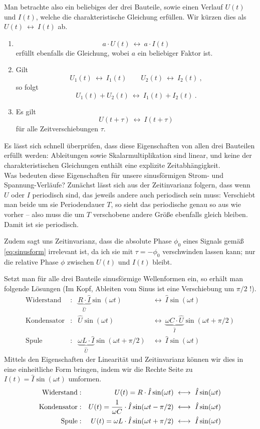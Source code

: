 \def\llra{~\longleftrightarrow~}
Man betrachte also ein beliebiges der drei Bauteile, sowie einen Verlauf $U(t)$ und $I(t)$, welche die charakteristische Gleichung erfüllen. Wir kürzen dies als $U(t) \llra I(t)$ ab.
\begin{enumerate}[label=(\arabic*)]
    \item
        \[ a\cdot U(t) \llra a \cdot I(t) \]
        erfüllt ebenfalls die Gleichung, wobei $a$ ein beliebiger Faktor ist.
    \item Gilt
        \[ U_1(t) \llra I_1(t) \qquad U_2(t) \llra I_2(t) ~,\]
        so folgt
        \[ U_1(t) + U_2(t) \llra I_1(t) + I_2(t) ~. \]
    \item Es gilt
        \[ U(t+\tau) \llra I(t+\tau) \]
        für alle Zeitverschiebungen $\tau$.
\end{enumerate}

Es lässt sich schnell überprüfen, dass diese Eigenschaften von allen drei Bauteilen erfüllt werden: Ableitungen sowie Skalarmultiplikation sind linear, und keine der charakteristischen Gleichungen enthält eine explizite Zeitabhängigkeit.
\\

Was bedeuten diese Eigenschaften für unsere sinusförmigen Strom- und Spannung-Verläufe? Zunächst lässt sich aus der Zeitinvarianz folgern, dass wenn $U$ oder $I$ periodisch sind, das jeweils andere auch periodisch sein muss: Verschiebt man beide um sie Periodendauer $T$, so sieht das periodische genau so aus wie vorher -- also muss die um $T$ verschobene andere Größe ebenfalls gleich bleiben. Damit ist sie periodisch.

Zudem sagt uns Zeitinvarianz, dass die absolute Phase $\phi_0$ eines Signals gemäß \eqref{eq:sinusform} irrelevant ist, da ich sie mit $\tau = -\phi_0$ verschwinden lassen kann; nur die relative Phase $\phi$ zwischen $U(t)$ und $I(t)$ bleibt.

Setzt man für alle drei Bauteile sinusförmige Wellenformen ein, so erhält man folgende Lösungen (Im Kopf, Ableiten vom Sinus ist eine Verschiebung um $\pi/2$ !).
\begin{align*}
    \text{Widerstand} &: & \underbrace{R\cdot \hat I}_{\hat U}\sin(\omega t)
    & \llra \hat{I}\sin(\omega t)
    \\
    \text{Kondensator} &: & \hat U\sin(\omega t)
    & \llra \underbrace{\omega C \cdot \hat U}_{\hat{I}}\sin(\omega t + \pi/2)
    \\
\text{Spule} &: &  \underbrace{\omega L\cdot \hat I}_{\hat U}\sin(\omega t + \pi/2)
    & \llra \hat{I}\sin(\omega t)
\end{align*}
Mittels den Eigenschaften der Linearität und Zeitinvarianz können wir dies in eine einheitliche Form bringen, indem wir die Rechte Seite zu $I(t) = \hat I\sin(\omega t)$ umformen.
\begin{align*}
    \text{Widerstand} &: & U(t) = R \cdot \hat I\sin(\omega t)
    & \llra \hat{I}\sin(\omega t)
    \\
    \text{Kondensator} &: & U(t) = {1\over \omega C}\cdot  \hat I\sin(\omega t - \pi/2)
    & \llra \hat{I}\sin(\omega t)
    \\
\text{Spule} &: &  U(t) = \omega L \cdot \hat I\sin(\omega t + \pi/2)
    & \llra \hat{I}\sin(\omega t)
\end{align*}
